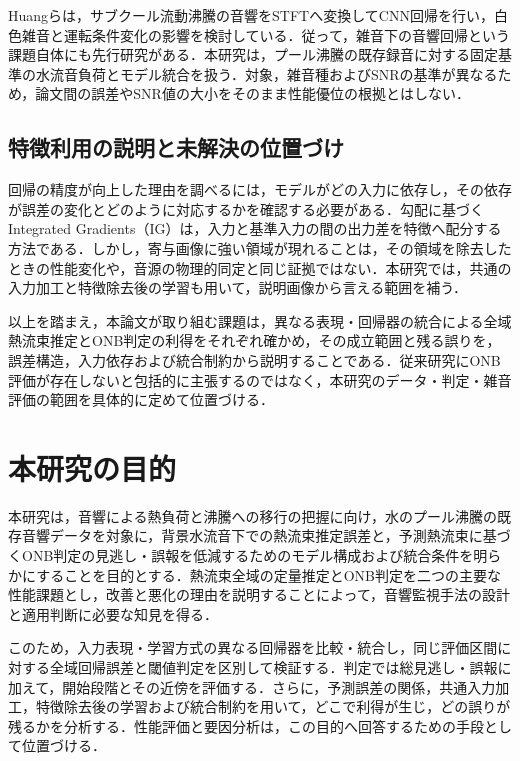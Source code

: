 Huangら\cite{huang2026}は，サブクール流動沸騰の音響をSTFTへ変換してCNN回帰を行い，白色雑音と運転条件変化の影響を検討している．従って，雑音下の音響回帰という課題自体にも先行研究がある．本研究は，プール沸騰の既存録音に対する固定基準の水流音負荷とモデル統合を扱う．対象，雑音種およびSNRの基準が異なるため，論文間の誤差やSNR値の大小をそのまま性能優位の根拠とはしない．

\subsection{特徴利用の説明と未解決の位置づけ}
回帰の精度が向上した理由を調べるには，モデルがどの入力に依存し，その依存が誤差の変化とどのように対応するかを確認する必要がある．勾配に基づくIntegrated Gradients（IG）\cite{sundararajan2017}は，入力と基準入力の間の出力差を特徴へ配分する方法である．しかし，寄与画像に強い領域が現れることは，その領域を除去したときの性能変化や，音源の物理的同定と同じ証拠ではない．本研究では，共通の入力加工と特徴除去後の学習も用いて，説明画像から言える範囲を補う．

以上を踏まえ，本論文が取り組む課題は，異なる表現・回帰器の統合による全域熱流束推定とONB判定の利得をそれぞれ確かめ，その成立範囲と残る誤りを，誤差構造，入力依存および統合制約から説明することである．従来研究にONB評価が存在しないと包括的に主張するのではなく，本研究のデータ・判定・雑音評価の範囲を具体的に定めて位置づける．

\section{本研究の目的}\label{sec:purpose}
本研究は，音響による熱負荷と沸騰への移行の把握に向け，水のプール沸騰の既存音響データを対象に，背景水流音下での熱流束推定誤差と，予測熱流束に基づくONB判定の見逃し・誤報を低減するためのモデル構成および統合条件を明らかにすることを目的とする．熱流束全域の定量推定とONB判定を二つの主要な性能課題とし，改善と悪化の理由を説明することによって，音響監視手法の設計と適用判断に必要な知見を得る．

このため，入力表現・学習方式の異なる回帰器を比較・統合し，同じ評価区間に対する全域回帰誤差と閾値判定を区別して検証する．判定では総見逃し・誤報に加えて，開始段階とその近傍を評価する．さらに，予測誤差の関係，共通入力加工，特徴除去後の学習および統合制約を用いて，どこで利得が生じ，どの誤りが残るかを分析する．性能評価と要因分析は，この目的へ回答するための手段として位置づける．

